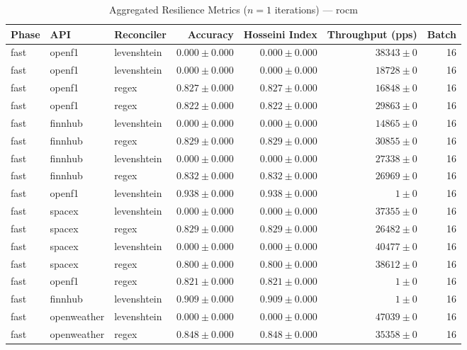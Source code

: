 
\begin{table}[htbp]
\caption{Aggregated Resilience Metrics ($n=1$ iterations) --- rocm}
\begin{tabular}{l l l r r r r}
\hline
Phase & API & Reconciler & Accuracy & Hosseini Index & Throughput (pps) & Batch \\
\hline
fast & openf1 & levenshtein & $0.000\pm0.000$ & $0.000\pm0.000$ & $38343\pm0$ & 16 \\
fast & openf1 & levenshtein & $0.000\pm0.000$ & $0.000\pm0.000$ & $18728\pm0$ & 16 \\
fast & openf1 & regex & $0.827\pm0.000$ & $0.827\pm0.000$ & $16848\pm0$ & 16 \\
fast & openf1 & regex & $0.822\pm0.000$ & $0.822\pm0.000$ & $29863\pm0$ & 16 \\
fast & finnhub & levenshtein & $0.000\pm0.000$ & $0.000\pm0.000$ & $14865\pm0$ & 16 \\
fast & finnhub & regex & $0.829\pm0.000$ & $0.829\pm0.000$ & $30855\pm0$ & 16 \\
fast & finnhub & levenshtein & $0.000\pm0.000$ & $0.000\pm0.000$ & $27338\pm0$ & 16 \\
fast & finnhub & regex & $0.832\pm0.000$ & $0.832\pm0.000$ & $26969\pm0$ & 16 \\
fast & openf1 & levenshtein & $0.938\pm0.000$ & $0.938\pm0.000$ & $1\pm0$ & 16 \\
fast & spacex & levenshtein & $0.000\pm0.000$ & $0.000\pm0.000$ & $37355\pm0$ & 16 \\
fast & spacex & regex & $0.829\pm0.000$ & $0.829\pm0.000$ & $26482\pm0$ & 16 \\
fast & spacex & levenshtein & $0.000\pm0.000$ & $0.000\pm0.000$ & $40477\pm0$ & 16 \\
fast & spacex & regex & $0.800\pm0.000$ & $0.800\pm0.000$ & $38612\pm0$ & 16 \\
fast & openf1 & regex & $0.821\pm0.000$ & $0.821\pm0.000$ & $1\pm0$ & 16 \\
fast & finnhub & levenshtein & $0.909\pm0.000$ & $0.909\pm0.000$ & $1\pm0$ & 16 \\
fast & openweather & levenshtein & $0.000\pm0.000$ & $0.000\pm0.000$ & $47039\pm0$ & 16 \\
fast & openweather & regex & $0.848\pm0.000$ & $0.848\pm0.000$ & $35358\pm0$ & 16 \\

\end{tabular}
\end{table}
